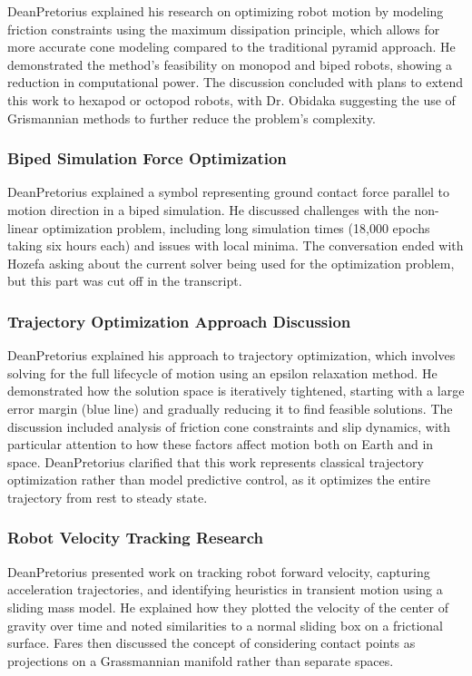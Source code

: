 DeanPretorius explained his research on optimizing robot motion by modeling friction constraints using the maximum dissipation principle, which allows for more accurate cone modeling compared to the traditional pyramid approach. He demonstrated the method's feasibility on monopod and biped robots, showing a reduction in computational power. The discussion concluded with plans to extend this work to hexapod or octopod robots, with Dr. Obidaka suggesting the use of Grismannian methods to further reduce the problem's complexity.

\subsubsection{Biped Simulation Force Optimization}

DeanPretorius explained a symbol representing ground contact force parallel to motion direction in a biped simulation. He discussed challenges with the non-linear optimization problem, including long simulation times (18,000 epochs taking six hours each) and issues with local minima. The conversation ended with Hozefa asking about the current solver being used for the optimization problem, but this part was cut off in the transcript.

\subsubsection{Trajectory Optimization Approach Discussion}

DeanPretorius explained his approach to trajectory optimization, which involves solving for the full lifecycle of motion using an epsilon relaxation method. He demonstrated how the solution space is iteratively tightened, starting with a large error margin (blue line) and gradually reducing it to find feasible solutions. The discussion included analysis of friction cone constraints and slip dynamics, with particular attention to how these factors affect motion both on Earth and in space. DeanPretorius clarified that this work represents classical trajectory optimization rather than model predictive control, as it optimizes the entire trajectory from rest to steady state.

\subsubsection{Robot Velocity Tracking Research}

DeanPretorius presented work on tracking robot forward velocity, capturing acceleration trajectories, and identifying heuristics in transient motion using a sliding mass model. He explained how they plotted the velocity of the center of gravity over time and noted similarities to a normal sliding box on a frictional surface. Fares then discussed the concept of considering contact points as projections on a Grassmannian manifold rather than separate spaces.

